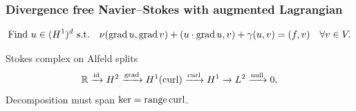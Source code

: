 \documentclass[presentation,aspectratio=43, 10pt]{beamer}
\DeclareMathOperator{\grad}{grad}
\let\div\relax
\DeclareMathOperator{\div}{div}
\DeclareMathOperator{\curl}{curl}
\DeclareMathOperator{\range}{range}
\begin{document}
\begin{frame}[fragile,t]
  \frametitle{Divergence free Navier--Stokes with augmented Lagrangian}
  \vspace{-1.5\baselineskip}
  {\small\begin{equation*}
    \text{Find $u \in (H^1)^d$ s.t.}\quad \nu(\grad u, \grad v) + (u\cdot \grad u, v) + \gamma(\div u, \div v) = (f, v) \quad \forall v \in V.
  \end{equation*}}
  \vspace*{-\baselineskip}
  \begin{block}{Stokes complex on Alfeld splits}
    \begin{equation*}
      \mathbb{R} \xrightarrow{\operatorname{id}} H^2 \xrightarrow{\grad} H^1(\curl)
      \xrightarrow{\curl} H^1 \xrightarrow{\div} L^2 \xrightarrow{\operatorname{null}} 0,
    \end{equation*}
    Decomposition must span $\ker \div = \range \curl$.


\end{block}
\end{frame}
\end{document}
